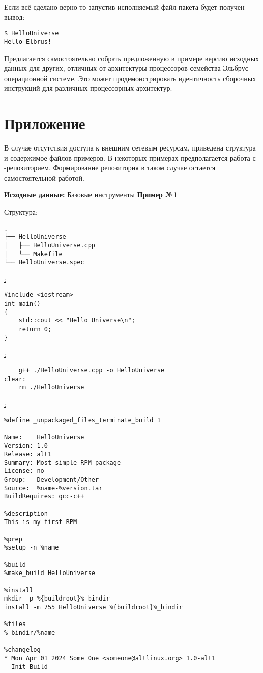 Если всё сделано верно то запустив исполняемый файл пакета будет получен вывод:
\begin{verbatim}
$ HelloUniverse
Hello Elbrus!

\end{verbatim}

Предлагается самостоятельно собрать предложенную в примере версию исходных
данных для других, отличных от архитектуры процессоров семейства Эльбрус
операционной системе. Это может продемонстрировать  идентичность сборочных
инструкций  для различных процессорных архитектур.


\section{Приложение}
В случае отсутствия доступа к внешним сетевым ресурсам, приведена структура
и содержимое файлов примеров. В некоторых примерах предполагается работа с
-репозиторием. Формирование репозитория в таком случае остается
самостоятельной работой.

\textbf{Исходные данные:} Базовые инструменты  \textbf{Пример №1}

\noindent Структура:
\begin{verbatim}
.
├── HelloUniverse
│   ├── HelloUniverse.cpp
│   └── Makefile
└── HelloUniverse.spec

\end{verbatim}

\noindent\underline{:}
\begin{verbatim}
#include <iostream>
int main()
{
    std::cout << "Hello Universe\n";
    return 0;
}

\end{verbatim}

\noindent\underline{:}
\begin{verbatim}
    g++ ./HelloUniverse.cpp -o HelloUniverse
clear:
    rm ./HelloUniverse

\end{verbatim}

\noindent\underline{:}
\begin{verbatim}
%define _unpackaged_files_terminate_build 1

Name:    HelloUniverse
Version: 1.0
Release: alt1
Summary: Most simple RPM package
License: no
Group:   Development/Other
Source:  %name-%version.tar
BuildRequires: gcc-c++

%description
This is my first RPM

%prep
%setup -n %name

%build
%make_build HelloUniverse

%install
mkdir -p %{buildroot}%_bindir
install -m 755 HelloUniverse %{buildroot}%_bindir

%files
%_bindir/%name

%changelog
* Mon Apr 01 2024 Some One <someone@altlinux.org> 1.0-alt1
- Init Build

\end{verbatim}


